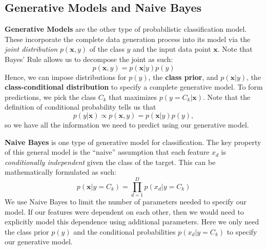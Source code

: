 \documentclass[11pt, letterpaper]{article}
\theoremstyle{definition}
\theoremstyle{plain}
\begin{document}
\subsection{Generative Models and Naive Bayes}

\textbf{Generative Models} are the other type of probabilistic classification model. These incorporate the complete data generation process into its model via the \emph{joint distribution} $p(\bm{x}, y)$ of the class $y$ and the input data point $\mathbf{x}$. Note that Bayes' Rule allows us to decompose the joint as such:
\[p(\bm{x}, y) = p(\bm{x}|y)p(y)\]
Hence, we can impose distributions for $p(y)$, the \textbf{class prior}, and $p(\bm{x}|y)$, the \textbf{class-conditional distribution} to specify a complete generative model. To form predictions, we pick the class $C_k$ that maximizes $p(y=C_k|\bm{x})$. Note that the definition of conditional probability tells us that 
\[p(y|\bm{x}) \propto p(\bm x, y) = p(\bm{x}|y)p(y),\]
so we have all the information we need to predict using our generative model.

\textbf{Naive Bayes} is one type of generative model for classification. The key property of this general model is the ``naive'' assumption that each feature $x_d$ is \textit{conditionally independent} given the class of the target. This can be mathematically formulated as such:
\[p(\bm x |y = C_k) =  \prod_{d=1}^D p(x_d|y=C_k)\]
We use Naive Bayes to limit the number of parameters needed to specify our model. If our features were dependent on each other, then we would need to explicitly model this dependence using additional parameters. Here we only need the class prior $p(y)$ and the conditional probabilities $p(x_d | y=C_k)$ to specify our generative model.
\end{document}
